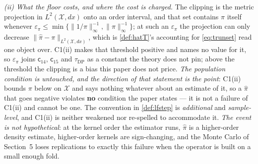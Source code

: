 \emph{(ii) What the floor costs, and where the cost is charged.} The clipping is the metric projection
in $L^{2}(\mathcal X,dx)$ onto an order interval, and that set contains $\pi$ itself whenever
$\varepsilon_\pi\le\min\{\|1/\pi\|^{-1}_\infty,\|\pi\|^{-1}_\infty\}$; at such an $\varepsilon_\pi$ the
projection can only decrease $\|\hat\pi-\pi\|_{L^{2}(\mathcal X,dx)}$, which is
\cref{def:hatT}'s accounting for \eqref{eq:trunset} read one object over. C1(ii) makes that threshold
positive and names no value for it, so $\varepsilon_\pi$ joins $\mathsf c_{14}$, $\mathsf c_{15}$ and
$\tau_{\mathrm{DP}}$ as a constant the theory does not pin; above the threshold the clipping is a bias
this paper does not price. \emph{The population condition is untouched, and the direction of that
statement is the point}: C1(ii) bounds $\pi$ below on $\mathcal X$ and says nothing whatever about an
estimate of it, so a $\hat\pi$ that goes negative violates \textbf{no} condition the paper states --- it
is not a failure of C1(ii) and cannot be one. The convention in \cref{def:lfstep} is
\emph{additional} and \emph{sample-level}, and C1(ii) is neither weakened nor re-spelled to accommodate
it. \emph{The event is not hypothetical}: at the kernel order the estimator runs, $\hat\pi$ is a
higher-order density estimate, higher-order kernels are sign-changing, and the Monte Carlo of
Section~5 loses replications to exactly this failure when the operator is built on a small enough fold.

